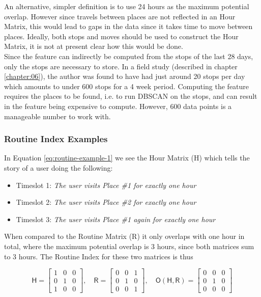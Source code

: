 An alternative, simpler definition is to use 24 hours as the maximum potential overlap. However since travels between places are not reflected in an Hour Matrix, this would lead to gaps in the data since it takes time to move between places. Ideally, both stops and moves should be used to construct the Hour Matrix, it is not at present clear how this would be done.\\

Since the feature can indirectly be computed from the stops of the last 28 days, only the stops are necessary to store. In a field study (described in chapter \ref{chapter:06}), the author was found to have had just around 20 stops per day which amounts to under 600 stops for a 4 week period. Computing the feature requires the places to be found, i.e. to run DBSCAN on the stops, and can result in the feature being expensive to compute. However, 600 data points is a manageable number to work with.

\subsubsection*{Routine Index Examples}

In Equation \eqref{eq:routine-example-1} we see the Hour Matrix (H) which tells the story of a user doing the following:

\begin{itemize}
    \item Timeslot 1: \textit{The user visits Place \#1 for exactly one hour}
    \item Timeslot 2: \textit{The user visits Place \#2 for exactly one hour}
    \item Timeslot 3: \textit{The user visits Place \#1 again for exactly one hour}
\end{itemize}

When compared to the Routine Matrix (R) it only overlaps with one hour in total, where the maximum potential overlap is 3 hours, since both matrices sum to 3 hours. The Routine Index for these two matrices is thus  \label{eq:routine-index-1} 

\begin{equation}
\label{eq:routine-example-1}
    \mathsf{H} = 
    \begin{bmatrix}
    1 & 0 & 0\\
    0 & 1 & 0\\
    1 & 0 & 0
    \end{bmatrix},\quad
    \mathsf{R} = 
    \begin{bmatrix}
    0 & 0 & 1\\
    0 & 1 & 0\\
    0 & 0 & 1
    \end{bmatrix},\quad
    \mathsf{O}(\mathsf{H}, \mathsf{R}) = 
    \begin{bmatrix}
    0 & 0 & 0\\
    0 & 1 & 0\\
    0 & 0 & 0
    \end{bmatrix}
\end{equation}

